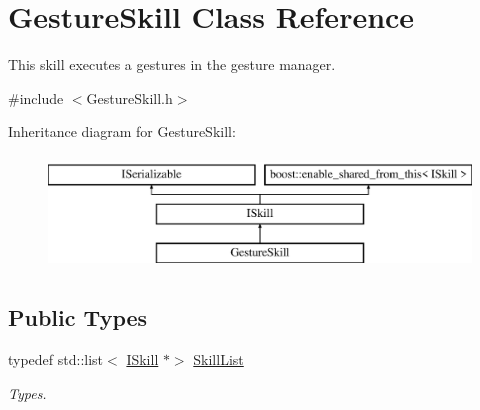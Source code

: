 \hypertarget{class_gesture_skill}{}\section{Gesture\+Skill Class Reference}
\label{class_gesture_skill}


This skill executes a gestures in the gesture manager.  




{\ttfamily \#include $<$Gesture\+Skill.\+h$>$}

Inheritance diagram for Gesture\+Skill\+:\begin{figure}[H]
\begin{center}
\leavevmode
\includegraphics[height=3.000000cm]{class_gesture_skill}
\end{center}
\end{figure}
\subsection*{Public Types}
\begin{DoxyCompactItemize}
\item 
\mbox{\label{class_gesture_skill_ab8669ee642c7c699bcabf333852fbb74}} 
typedef std\+::list$<$ \hyperlink{class_i_skill}{I\+Skill} $\ast$$>$ \hyperlink{class_gesture_skill_ab8669ee642c7c699bcabf333852fbb74}{Skill\+List}
\begin{DoxyCompactList}\small\item\em Types. \end{DoxyCompactList}\end{DoxyCompactItemize}
